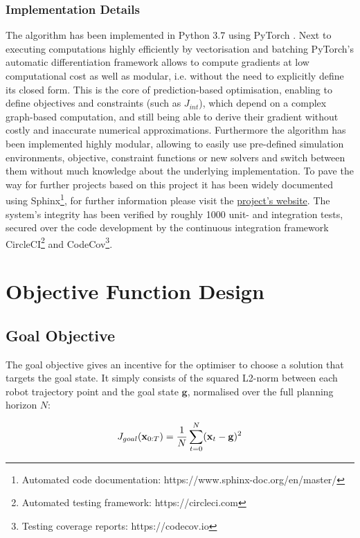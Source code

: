 \subsubsection{Implementation Details} 
The algorithm has been implemented in Python 3.7 using PyTorch \cite{pytorch}. Next to executing computations highly efficiently by vectorisation and batching PyTorch's automatic differentiation framework allows to compute gradients at low computational cost as well as modular, i.e. without the need to explicitly define its closed form. This is the core of prediction-based optimisation, enabling to define objectives and constraints (such as $J_{int}$), which depend on a complex graph-based computation, and still being able to derive their gradient without  costly and inaccurate numerical approximations. 
\newline 
Furthermore the algorithm has been implemented highly modular, allowing to easily use pre-defined simulation environments, objective, constraint functions or new solvers and switch between them without much knowledge about the underlying implementation. To pave the way for further projects based on this project it has been widely documented using Sphinx\footnote{Automated code documentation: https://www.sphinx-doc.org/en/master/}, for further information please visit the \href{https://simon-schaefer.github.io/mantrap/}{project's website}.  
\newline
The system's integrity has been verified by roughly 1000 unit- and integration tests, secured over the code development by the continuous integration framework CircleCI\footnote{Automated testing framework: https://circleci.com} and CodeCov\footnote{Testing coverage reports: https://codecov.io}.

\section{Objective Function Design}
\label{text:approach/objective}

\subsection{Goal Objective}
\label{text:approach/objective/goal}
The goal objective gives an incentive for the optimiser to choose a solution that targets the goal state. It simply consists of the squared L2-norm between each robot trajectory point and the goal state $\mathbf{g}$, normalised over the full planning horizon $N$:

\begin{equation}
J_{goal}(\mathbf{x}_{0:T}) = \frac{1}{N} \sum_{t = 0}^N (\mathbf{x}_t - \mathbf{g})^2
\end{equation}

